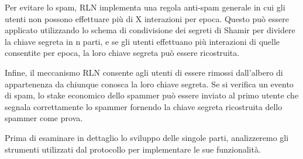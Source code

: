 Per evitare lo spam, RLN implementa una regola anti-spam generale in cui gli utenti non possono effettuare più di X interazioni per epoca. Questo può essere applicato utilizzando lo schema di condivisione dei segreti di Shamir per dividere la chiave segreta in n parti, e se gli utenti effettuano più interazioni di quelle consentite per epoca, la loro chiave segreta può essere ricostruita.

Infine, il meccanismo RLN consente agli utenti di essere rimossi dall'albero di appartenenza da chiunque conosca la loro chiave segreta. Se si verifica un evento di spam, lo stake economico dello spammer può essere inviato al primo utente che segnala correttamente lo spammer fornendo la chiave segreta ricostruita dello spammer come prova.

Prima di esaminare in dettaglio lo sviluppo delle singole parti, analizzeremo gli strumenti utilizzati dal protocollo
per implementare le sue funzionalità.





